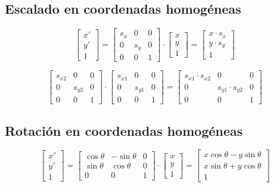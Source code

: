 \subsection{Escalado en coordenadas homogéneas}
$$\left[\begin{matrix}
x' \\ y' \\ 1
\end{matrix}\right] =
\left[\begin{matrix}
s_x & 0 & 0 \\ 0 & s_y & 0 \\ 0 & 0 & 1
\end{matrix}\right] \cdot
\left[\begin{matrix}
x \\ y \\ 1
\end{matrix}\right]=
\left[\begin{matrix}
x\cdot s_x \\ y\cdot s_y \\ 1
\end{matrix}\right]$$

$$\left[\begin{matrix}
    s_{x2} & 0 & 0 \\ 0 & s_{y2} & 0 \\ 0 & 0 & 1
\end{matrix}\right] \cdot
\left[\begin{matrix}
    s_{x1} & 0 & 0 \\ 0 & s_{y1} & 0 \\ 0 & 0 & 1
\end{matrix}\right]=
\left[\begin{matrix}
s_{x1} \cdot s_{x2} & 0 & 0 \\ 0 & s_{y1} \cdot s_{y2} & 0 \\ 0 & 0 & 1
\end{matrix}\right]$$

\subsection{Rotación en coordenadas homogéneas}
$$\left[\begin{matrix}
x' \\ y' \\ 1
\end{matrix}\right] =
\left[\begin{matrix}
\cos \theta & - \sin \theta & 0 \\ \sin \theta & \cos \theta & 0 \\ 0 & 0 & 1
\end{matrix}\right] \cdot
\left[\begin{matrix}
x \\ y \\ 1
\end{matrix}\right]=
\left[\begin{matrix}
x \cos \theta - y \sin \theta \\ x \sin \theta + y \cos \theta \\ 1
\end{matrix}\right]$$

